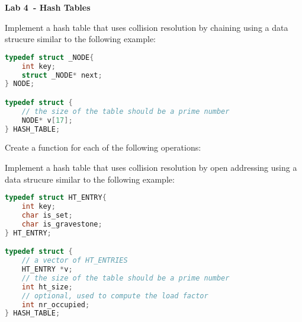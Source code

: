 \documentclass{exam}
\newcommand\labnr{4}
\newcommand\lab{Lab \labnr\ - Hash Tables}
\newcommand\lvlez{$\bigstar$}
\newcommand\lvlmed{\lvlez\lvlez}
\begin{document}
\begin{center}
    \vspace*{0cm}
    \bfseries\LARGE
    \lab
    \vspace*{1cm}
\end{center}


\begin{questions}
\question Implement a hash table that uses collision resolution by chaining using a data strucure similar to the following example:

\begin{lstlisting}[language=C]
typedef struct _NODE{
    int key;
    struct _NODE* next;
} NODE;

typedef struct {
    // the size of the table should be a prime number 
    NODE* v[17];
} HASH_TABLE;
\end{lstlisting}



Create a function for each of the following operations:

\question Implement a hash table that uses collision resolution by open addressing using a data strucure similar to the following example:

\begin{lstlisting}[language=C]
typedef struct HT_ENTRY{
    int key;
    char is_set;
    char is_gravestone;
} HT_ENTRY;

typedef struct {
    // a vector of HT_ENTRIES
    HT_ENTRY *v;
    // the size of the table should be a prime number 
    int ht_size;
    // optional, used to compute the load factor
    int nr_occupied;
} HASH_TABLE;
\end{lstlisting}



\bigskip
\begin{parts}

\end{parts}
\end{questions}
\end{document}
